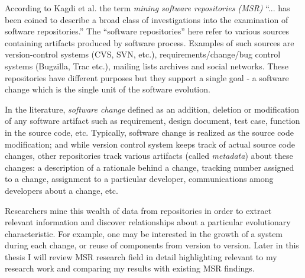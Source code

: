 %
According to Kagdi et al. \cite{citeulike:4534888} the term \textit{mining
software repositories (MSR)} ``... has been coined to describe a broad class of
investigations into the examination of software repositories.'' The ``software
repositories'' here refer to various sources containing artifacts produced by
software process. Examples of such sources are version-control systems (CVS,
SVN, etc.), requirements/change/bug control systems (Bugzilla, Trac etc.),
mailing lists archives and social networks. These repositories have different
purposes but they support a single goal - a software change which is the single
unit of the software evolution. 

In the literature, \textit{software change} defined as an addition, deletion or
modification of any software artifact such as requirement, design document, test
case, function in the source code, etc. Typically, software change is realized
as the source code modification; and while version control system keeps track of
actual source code changes, other repositories track various artifacts (called
\textit{metadata}) about these changes: a description of a rationale behind a
change, tracking number assigned to a change, assignment to a particular
developer, communications among developers about a change, etc.

Researchers mine this wealth of data from repositories in order to extract
relevant information and discover relationships about a particular evolutionary
characteristic. For example, one may be interested in the growth of a system
during each change, or reuse of components from version to version. Later in this
thesis I will review MSR research field in detail highlighting relevant to my
research work and comparing my results with existing MSR findings.